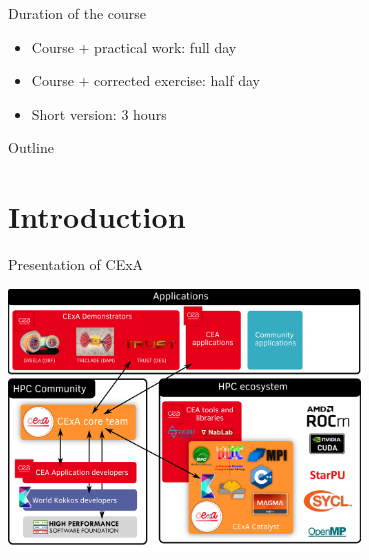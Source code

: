 \documentclass[aspectratio=169]{beamer}
\begin{document}
\begin{frame}{Duration of the course}
    \begin{itemize}
        \item Course + practical work: full day
        \item Course + corrected exercise: half day
        \item Short version: 3 hours
    \end{itemize}
\end{frame}

\begin{frame}{Outline}
    \tableofcontents[hidesubsections]
\end{frame}


\section{Introduction}


\begin{frame}{Presentation of CExA}
    \begin{center}
        \includegraphics[width=0.7\textwidth]{cexa.png}
    \end{center}
\end{frame}

\end{document}
